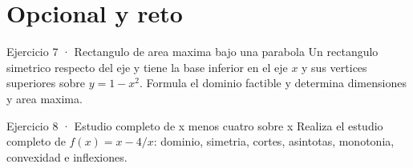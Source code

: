 \documentclass[10pt,a4paper,oneside,openany]{book}
\begin{document}
\section*{Opcional y reto}
\begin{PSevenOptionalFixed}{Ejercicio 7 · Rectangulo de area maxima bajo una parabola}
Un rectangulo simetrico respecto del eje y tiene la base inferior en el eje \(x\) y sus vertices superiores sobre \(y=1-x^{2}\). Formula el dominio factible y determina dimensiones y area maxima.
\end{PSevenOptionalFixed}
\begin{PSevenOptionalFixed}{Ejercicio 8 · Estudio completo de x menos cuatro sobre x}
Realiza el estudio completo de \(f(x)=x-4/x\): dominio, simetria, cortes, asintotas, monotonia, convexidad e inflexiones.
\end{PSevenOptionalFixed}
\end{document}
